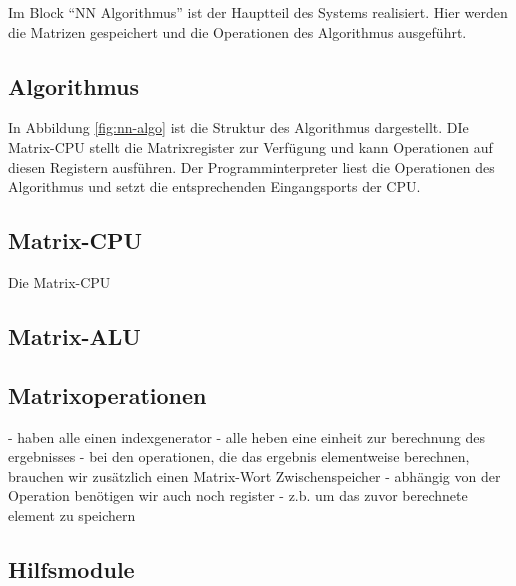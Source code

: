 \documentclass
[ 12pt,
  parskip=half %
]{scrreprt}
\begin{document}
Im Block "`NN Algorithmus"' ist der Hauptteil des Systems realisiert. Hier werden die Matrizen gespeichert und die Operationen des Algorithmus ausgeführt.


\subsection{Algorithmus}

In Abbildung \ref{fig:nn-algo} ist die Struktur des Algorithmus dargestellt. DIe Matrix-CPU stellt die Matrixregister zur Verfügung und kann Operationen auf diesen Registern ausführen. Der Programminterpreter liest die Operationen des Algorithmus und setzt die entsprechenden Eingangsports der CPU.


\subsection{Matrix-CPU}

Die Matrix-CPU

\subsection{Matrix-ALU}


\subsection{Matrixoperationen}

- haben alle einen indexgenerator
- alle heben eine einheit zur berechnung des ergebnisses
- bei den operationen, die das ergebnis elementweise berechnen, brauchen wir zusätzlich einen Matrix-Wort Zwischenspeicher
- abhängig von der Operation benötigen wir auch noch register 
	- z.b. um das zuvor berechnete element zu speichern


\subsection{Hilfsmodule}
\end{document}
